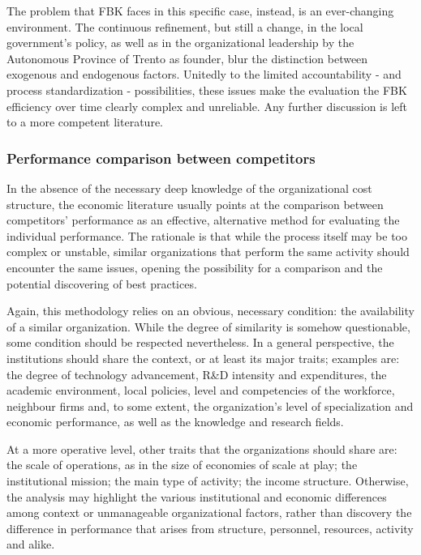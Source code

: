 The problem that FBK faces in this specific case, instead, is an ever-changing environment. The continuous refinement, but still a change, in the local government's policy, as well as in the organizational leadership by the Autonomous Province of Trento as founder, blur the distinction between exogenous and endogenous factors. Unitedly to the limited accountability - and process standardization - possibilities, these issues make the evaluation the FBK efficiency over time clearly complex and unreliable. Any further discussion is left to a more competent literature.

\subsubsection{Performance comparison between competitors}

In the absence of the necessary deep knowledge of the organizational cost structure, the economic literature usually points at the comparison between competitors' performance as an effective, alternative method for evaluating the individual performance. The rationale is that while the process itself may be too complex or unstable, similar organizations that perform the same activity should encounter the same issues, opening the possibility for a comparison and the potential discovering of best practices.

Again, this methodology relies on an obvious, necessary condition: the availability of a similar organization. While the degree of similarity is somehow questionable, some condition should be respected nevertheless. In a general perspective, the institutions should share the context, or at least its major traits; examples are: the degree of technology advancement, R\&D intensity and expenditures, the academic environment, local policies, level and competencies of the workforce, neighbour firms and, to some extent, the organization's level of specialization and economic performance, as well as the knowledge and research fields.

At a more operative level, other traits that the organizations should share are: the scale of operations, as in the size of economies of scale at play; the institutional mission; the main type of activity; the income structure. Otherwise, the analysis may highlight the various institutional and economic differences among context or unmanageable organizational factors, rather than discovery the difference in performance that arises from structure, personnel, resources, activity and alike.

